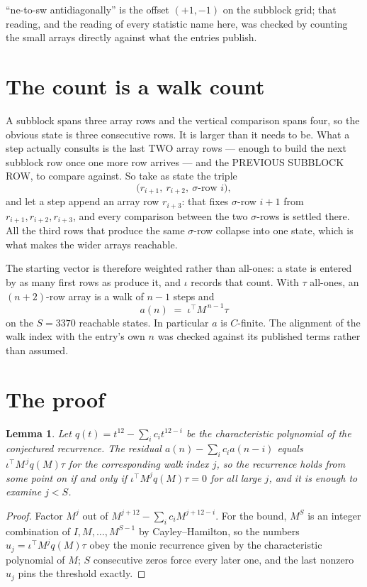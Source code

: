 \documentclass[11pt,a4paper]{article}
\theoremstyle{plain}
\newtheorem{lemma}[theorem]{Lemma}
\theoremstyle{definition}
\begin{document}
``ne-to-sw antidiagonally'' is the offset $(+1,-1)$ on the subblock grid; that reading, and
the reading of every statistic name here, was checked by counting the small arrays directly
against what the entries publish.

\section{The count is a walk count}

A subblock spans three array rows and the vertical comparison spans four, so the obvious state
is three consecutive rows. It is larger than it needs to be. What a step actually consults is
the last TWO array rows --- enough to build the next subblock row once one more row arrives ---
and the PREVIOUS SUBBLOCK ROW, to compare against. So take as state the triple
\[
\bigl(r_{i+1},\ r_{i+2},\ \sigma\text{-row }i\bigr),
\]
and let a step append an array row $r_{i+3}$: that fixes $\sigma$-row $i+1$ from
$r_{i+1},r_{i+2},r_{i+3}$, and every comparison between the two $\sigma$-rows is settled
there. All the third rows that produce the same $\sigma$-row collapse into one state, which is
what makes the wider arrays reachable.

The starting vector is therefore weighted rather than all-ones: a state is entered by as many
first rows as produce it, and $\iota$ records that count. With $\tau$ all-ones, an
$(n+2)$-row array is a walk of $n-1$ steps and
\[
a(n)\;=\;\iota^{\!\top}M^{\,n-1}\tau
\]
on the $S=3370$ reachable states. In particular $a$ is $C$-finite. The alignment of the walk
index with the entry's own $n$ was checked against its published terms rather than assumed.

\section{The proof}

\begin{lemma}\label{lem:crit}
Let $q(t)=t^{12}-\sum_i c_it^{12-i}$ be the characteristic polynomial of the
conjectured recurrence. The residual $a(n)-\sum_ic_ia(n-i)$ equals
$\iota^{\!\top}M^{\,j}q(M)\tau$ for the corresponding walk index $j$, so the recurrence
holds from some point on if and only if $\iota^{\!\top}M^{j}q(M)\tau=0$ for all large $j$,
and it is enough to examine $j<S$.
\end{lemma}

\begin{proof}
Factor $M^{j}$ out of $M^{j+12}-\sum_ic_iM^{j+12-i}$. For the bound, $M^{S}$
is an integer combination of $I,M,\dots,M^{S-1}$ by Cayley--Hamilton, so the numbers
$u_j=\iota^{\!\top}M^{j}q(M)\tau$ obey the monic recurrence given by the characteristic
polynomial of $M$; $S$ consecutive zeros force every later one, and the last nonzero $u_j$
pins the threshold exactly.
\end{proof}
\end{document}
